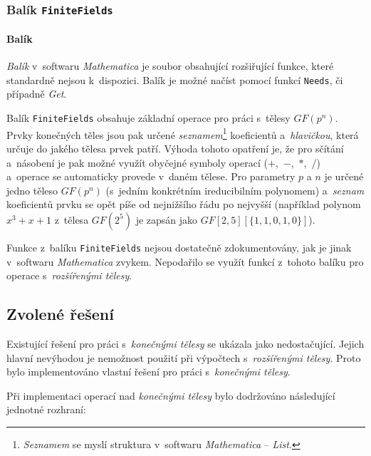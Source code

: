\documentclass[thesis=M,czech,hidelinks]{FITthesis}[2012/06/26]
\newcommand{\0}{{\textcolor[gray]{0.75}{0}}}
\begin{document}
\subsubsection{Balík \texttt{FiniteFields}}

\paragraph{Balík} \emph{Balík} v~softwaru \emph{Mathematica} je soubor
obsahující rozšiřující funkce, které standardně nejsou k~dispozici. Balík je
možné načíst pomocí funkcí \texttt{Needs}, či případně \emph{Get}.

Balík \texttt{FiniteFields} obsahuje základní operace pro práci s~tělesy
$GF(p^n)$. Prvky konečných těles jsou pak určené \emph{seznamem}\footnote{
    \emph{Seznamem} se myslí struktura v~softwaru \emph{Mathematica}
    -- \emph{List}.
} koeficientů a~\emph{hlavičkou}, která určuje do jakého tělesa prvek patří.
Výhoda tohoto opatření je, že pro sčítání a~násobení je pak možné využít
obyčejné symboly operací ($+$,~$-$,~$*$,~$/$) a~operace se automaticky provede
v~daném tělese. Pro parametry $p$ a $n$ je určené jedno těleso $GF(p^n)$
(s~jedním konkrétním ireducibilním polynomem) a~\emph{seznam} koeficientů prvku
se opět píše od nejnižšího řádu po nejvyšší (například polynom $x^3 + x + 1$
z~tělesa $GF(2^5)$ je zapsán jako $GF[2,5][\{1,1,0,1,0\}] $).

Funkce z~balíku \texttt{FiniteFields} nejsou dostatečně zdokumentovány, jak je
jinak v~softwaru \emph{Mathematica} zvykem. Nepodařilo se využít funkcí z~tohoto
balíku pro operace s~\emph{rozšířenými tělesy}.


\subsection{Zvolené řešení}

Existující řešení pro práci s~\emph{konečnými tělesy} se ukázala jako
nedostačující. Jejich hlavní nevýhodou je nemožnost použití při výpočtech
s~\emph{rozšířenými tělesy}. Proto bylo implementováno vlastní řešení pro práci
s~\emph{konečnými tělesy}.

Při implementaci operací nad \emph{konečnými tělesy} bylo dodržováno následující
jednotné rozhraní:
\end{document}
